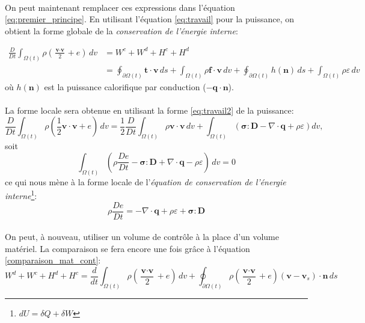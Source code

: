 \paragraph{}
On peut maintenant remplacer ces expressions dans l'équation \ref{eq:premier_principe}. En utilisant l'équation \ref{eq:travail} pour la puissance, on obtient la forme globale de la \emph{conservation de l'énergie interne}:


\begin{align}
\frac{D}{Dt}\int_{\Omega (t)}\rho\left(\frac{\textbf{v}\cdot\textbf{v}}{2}+e\right)\,dv&= W^c+W^d+H^c+H^d\\
 &=\oint_{\partial \Omega (t)}\textbf{t}\cdot\textbf{v}\,ds+\int_{\Omega (t)}\rho\textbf{f}\cdot\textbf{v}\,dv+\oint_{\partial \Omega (t)}h(\textbf{\^n})\,ds+\int_{\Omega (t)}\rho\varepsilon\,dv
\end{align}
où $h(\textbf{\^n})$ est la puissance calorifique par conduction ($-\textbf{q}\cdot\textbf{\^n}$).
\paragraph{}
La forme locale sera obtenue en utilisant la forme \ref{eq:travail2} de la puissance:
$$\frac{D}{Dt}\int_{\Omega  (t)}\rho\left(\frac{1}{2}\textbf{v}\cdot\textbf{v}+e\right)\,dv=\frac{1}{2}\frac{D}{Dt}\int_{\Omega (t)}\rho\textbf{v}\cdot\textbf{v}\,dv+\int_{\Omega (t)}(\boldsymbol{\sigma}:\textbf{D}-\nabla\cdot\textbf{q}+\rho\varepsilon)dv,$$
soit
$$\int_{\Omega (t)}\left(\rho\frac{De}{Dt}-\boldsymbol{\sigma}:\textbf{D}+\nabla\cdot\textbf{q}-\rho\varepsilon\right)\,dv=0$$
ce qui nous mène à la forme locale de l'\emph{équation de conservation de l'énergie interne}\footnote{$dU=\delta Q+\delta W$}:
$$\boxed{\rho\frac{De}{Dt}=-\nabla\cdot\textbf{q}+\rho\varepsilon+\boldsymbol{\sigma}:\textbf{D}}$$
\paragraph{}
On peut, à nouveau, utiliser un volume de contrôle à la place d'un volume matériel. La comparaison se fera encore une fois grâce à l'équation \ref{comparaison_mat_cont}:
\begin{equation}\label{energie_cont}W^d+W^c+H^d+H^c=\frac{d}{dt}\int_{\Omega (t)}\rho\left(\frac{\textbf{v}\cdot\textbf{v}}{2}+e\right)\,dv+\oint_{\partial\Omega (t)}\rho\left(\frac{\textbf{v}\cdot\textbf{v}}{2}+e\right)(\textbf{v}-\textbf{v}_s)\cdot\textbf{\^n}\,ds\end{equation}


